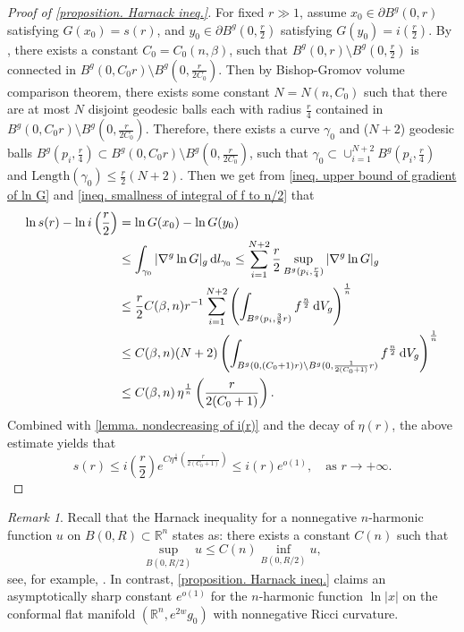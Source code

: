 \documentclass[12pt]{amsart}
\theoremstyle{plain}
\theoremstyle{definition}
\theoremstyle{remark}     %
\newtheorem{remark}[theorem]{Remark}
\numberwithin{equation}{section}
\newcommand{\dd}{\mathop{}\!\mathrm{d}}%
\begin{document}
\begin{proof}[Proof of \cref{proposition. Harnack ineq.}]
    For fixed $r\gg 1$, assume $x_0\in \partial B^g(0,r)$ satisfying $G(x_0)=s(r)$, and $y_0\in \partial B^g(0,\frac{r}{2})$ satisfying $G(y_0)=i(\frac{r}{2})$.
 By \cite[Proposition 4.5]{HK}, there exists a constant $C_0=C_0(n,\beta)$, such that $B^g(0,r)\setminus B^g(0,\frac{r}{2})$ is connected in $B^g(0,C_0r)\setminus B^g(0,\frac{r}{2C_0})$. Then by Bishop-Gromov volume comparison theorem, there exists some constant $N=N(n,C_0)$ such that there are at most $N$ disjoint geodesic balls each with radius $\frac{r}{4}$ contained in $B^g(0,C_0r)\setminus B^g(0,\frac{r}{2C_0})$. Therefore, there exists a curve $\gamma_0$ and  ($N+2$) geodesic balls $B^g(p_i,\frac{r}{4})
    \subset B^g(0,C_0r)\setminus B^g(0,\frac{r}{2C_0})$, such that $\gamma_0\subset \cup_{i=1}^{N+2}B^g(p_i,\frac{r}{4})$ and $\mathrm{Length}(\gamma_0)\leq \frac{r}{2}(N+2)$.
    Then we get from \cref{ineq. upper bound of gradient of ln G} and  \cref{ineq. smallness of integral of f to n/2} that
    \begin{align*}
        \ln s(r)-\ln i\left(\frac{r}{2}\right)
        &=\ln G(x_0)-\ln G(y_0) \\ \notag
        &\leq \int_{\gamma_0}|\nabla^g\ln G|_g\dd l_{\gamma_0}                \leq \sum_{i=1}^{N+2}\frac{r}{2}\sup_{B^g(p_i,\frac{r}{4})}|\nabla^g \ln G|_g\\
        &\leq \frac{r}{2}C(\beta,n)r^{-1}\sum_{i=1}^{N+2}
    \left(\int_{B^g(p_i,\frac{3}{8}r)} f^{\frac{n}{2}}\dd V_g \right)^{\frac{1}{n}}\\
    &\leq C(\beta,n)(N+2)
    \left(\int_{B^g(0,(C_0+1)r)\setminus B^g(0,\frac{1}{2(C_0+1)}r)} f^{\frac{n}{2}} \dd V_g \right)^{\frac{1}{n}}\\
    &\leq C(\beta,n)\, \eta^{\frac{1}{n}}\left(\frac{r}{2(C_0+1)}\right).
    \end{align*}
    Combined with \cref{lemma. nondecreasing of i(r)} and the decay of $\eta(r)$, the above estimate yields that
    \[
        s(r)\leq i\left(\frac{r}{2}\right)e^{C\eta^{\frac{1}{n}}
        \left(\frac{r}{2(C_0+1)}\right)}
        \leq i(r)e^{o(1)},\quad \text{as } r\to +\infty.
    \]
\end{proof}
\begin{remark}
    Recall that the Harnack inequality for a nonnegative $n$-harmonic function $u$ on $B(0,R)\subset\mathbb{R}^n$ states as: there exists a constant $C(n)$ such that
    \[
        \sup_{B(0,R/2)}u\leq C(n)\inf_{B(0,R/2)}u,
    \]
    see, for example, \cite[Theorem 2.20]{Lin}.
    In contrast, \cref{proposition. Harnack ineq.} claims an asymptotically sharp constant $e^{o(1)}$ for the $n$-harmonic function $\ln |x|$ on the conformal flat manifold $(\mathbb{R}^n,e^{2w}g_0)$ with nonnegative Ricci curvature.
\end{remark}
\end{document}
